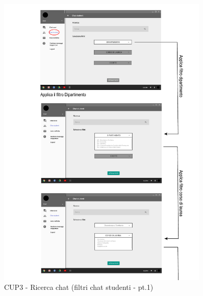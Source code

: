 \begin{figure}
	\centering
	\includegraphics[width=0.9\textwidth]{imgs/gruppo6/activities/act_cup3_filtro_chat_studenti1.pdf}
	\caption{CUP3 - Ricerca chat (filtri chat studenti - pt.1)}
	\label{fig:act-cup3-3}
\end{figure}

